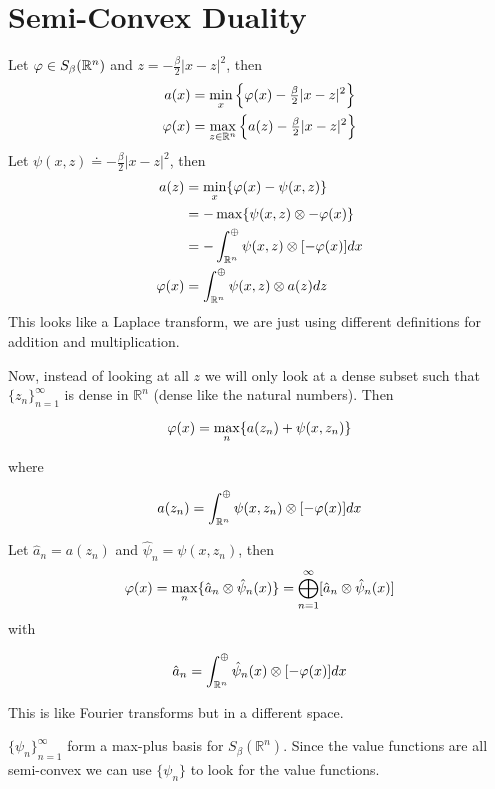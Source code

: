 \section{Semi-Convex Duality}
Let $\varphi\in S_\beta(\mathbb{R}^n)$ and $z=-\frac{\beta}{2}|x-z|^2$, then
\begin{align*}
a(x) &= \min_x\left\lbrace \varphi(x) - \tfrac{\beta}{2}|x-z|^2 \right\rbrace \\
\varphi(x) &= \max_{z\in\mathbb{R}^n}\left\lbrace a(z) - \tfrac{\beta}{2}|x-z|^2 \right\rbrace
\end{align*}
Let $\psi(x,z)\doteq -\tfrac{\beta}{2}|x-z|^2$, then
\begin{align*}
a(z) &= \min_x\{\varphi(x)-\psi(x,z)\} \\
&= -\max\{\psi(x,z)\otimes-\varphi(x)\} \\
&= -\int_{\mathbb{R}^n}^\oplus \psi(x,z)\otimes[-\varphi(x)]dx \\
\varphi(x) &= \int_{\mathbb{R}^n}^\oplus \psi(x,z)\otimes a(z)dz
\end{align*}
This looks like a Laplace transform, we are just using different definitions for addition and multiplication.

Now, instead of looking at all $z$ we will only look at a dense subset such that ${\{z_n\}}_{n=1}^\infty$ is dense in $\mathbb{R}^n$ (dense like the natural numbers).
Then

\begin{equation*}
\varphi(x) = \max_n\{a(z_n) + \psi(x,z_n)\}
\end{equation*}

where

\begin{equation*}
a(z_n) = \int_{\mathbb{R}^n}^\oplus \psi(x,z_n)\otimes [-\varphi(x)]dx
\end{equation*}

Let $\hat{a}_n=a(z_n)$ and $\hat{\psi}_n=\psi(x,z_n)$, then
\begin{align}
\label{eq:18vpx}
\varphi(x) = \max_n\{\hat{a}_n\otimes\hat{\psi}_n(x)\} = \bigoplus_{n=1}^\infty[\hat{a}_n\otimes\hat{\psi}_n(x)]
\end{align}
with

\begin{equation*}
\hat{a}_n = \int_{\mathbb{R}^n}^\oplus \hat{\psi}_n(x)\otimes [-\varphi(x)]dx
\end{equation*}

This is like Fourier transforms but in a different space.

${\{\psi_n\}}_{n=1}^\infty$ form a max-plus basis for $S_\beta(\mathbb{R}^n)$.
Since the value functions are all semi-convex we can use $\{\psi_n\}$ to look for the value functions.

